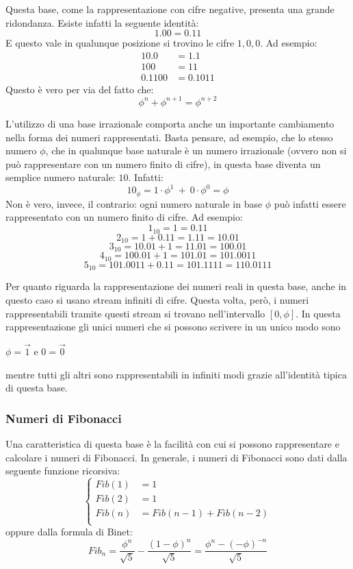 \documentclass[Lau]{sapthesis}
\begin{document}
Questa base, come la rappresentazione con cifre negative, presenta una grande ridondanza. Esiste infatti la seguente identità:
$$1.00 = 0.11$$
E questo vale in qualunque posizione si trovino le cifre $1,0,0$. Ad esempio:
\begin{align*}
10.0 & = 1.1 \tag{$\phi$}\\
100 & = 11 \tag{$\phi^2$}\\
0.1100 & = 0.1011 \tag{1}
\end{align*}
Questo è vero per via del fatto che:
$$\phi^n + \phi^{n+1} = \phi^{n+2}$$

L'utilizzo di una base irrazionale comporta anche un importante cambiamento nella forma dei numeri rappresentati. Basta pensare, ad esempio, che lo stesso numero $\phi$, che in qualunque base naturale è un numero irrazionale (ovvero non si può rappresentare con un numero finito di cifre), in questa base diventa un semplice numero naturale: $10$. Infatti:
$$10_\phi = 1 \cdot \phi^1 \ + \ 0 \cdot \phi^0 = \phi$$
Non è vero, invece, il contrario: ogni numero naturale in base $\phi$ può infatti essere rappresentato con un numero finito di cifre. Ad esempio:
$$1_{10} = 1 = 0.11$$
$$2_{10} = 1 + 0.11 = 1.11 = 10.01$$
$$3_{10} = 10.01 + 1 = 11.01 = 100.01$$
$$4_{10} = 100.01 + 1 = 101.01 = 101.0011$$
$$5_{10} = 101.0011 + 0.11 = 101.1111 = 110.0111$$

Per quanto riguarda la rappresentazione dei numeri reali in questa base, anche in questo caso si usano stream infiniti di cifre. Questa volta, però, i numeri rappresentabili tramite questi stream si trovano nell'intervallo $\left[0,\phi\right]$. In questa rappresentazione gli unici numeri che si possono scrivere in un unico modo sono
\begin{center}
$\phi = \overrightarrow{1}$ \hspace{0.5cm} e \hspace{0.5cm} $0 = \overrightarrow{0}$
\end{center}
mentre tutti gli altri sono rappresentabili in infiniti modi grazie all'identità tipica di questa base.


\subsubsection{Numeri di Fibonacci}
Una caratteristica di questa base è la facilità con cui si possono rappresentare e calcolare i numeri di Fibonacci. In generale, i numeri di Fibonacci sono dati dalla seguente funzione ricorsiva:
\begin{equation*}
\left\{
\begin{aligned}
Fib(1) & = 1\\
Fib(2) & = 1\\
Fib(n) & = Fib(n-1) + Fib(n-2)\\
\end{aligned}
\right.
\end{equation*}
oppure dalla formula di Binet:
$$Fib_n = \frac{\phi^n}{\sqrt{5}} - \frac{\left(1 - \phi\right)^n}{\sqrt{5}} = \frac{\phi^n - (-\phi)^{-n}}{\sqrt{5}}$$
\end{document}
